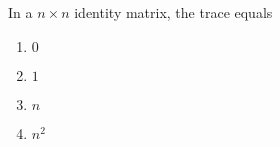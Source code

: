 \item  In a $n\times n $ identity matrix, the trace equals \hfill{}

\begin{multicols}{4}
\begin{enumerate}
\item $0$
\item $1$
\item $n$
\item $n^2$
\end{enumerate}
\end{multicols}

